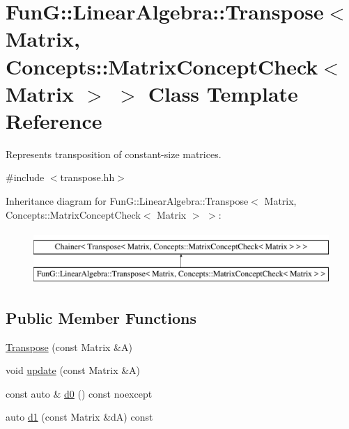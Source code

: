 \hypertarget{classFunG_1_1LinearAlgebra_1_1Transpose_3_01Matrix_00_01Concepts_1_1MatrixConceptCheck_3_01Matrix_01_4_01_4}{\section{Fun\-G\-:\-:Linear\-Algebra\-:\-:Transpose$<$ Matrix, Concepts\-:\-:Matrix\-Concept\-Check$<$ Matrix $>$ $>$ Class Template Reference}
\label{classFunG_1_1LinearAlgebra_1_1Transpose_3_01Matrix_00_01Concepts_1_1MatrixConceptCheck_3_01Matrix_01_4_01_4}
}


Represents transposition of constant-\/size matrices.  




{\ttfamily \#include $<$transpose.\-hh$>$}

Inheritance diagram for Fun\-G\-:\-:Linear\-Algebra\-:\-:Transpose$<$ Matrix, Concepts\-:\-:Matrix\-Concept\-Check$<$ Matrix $>$ $>$\-:\begin{figure}[H]
\begin{center}
\leavevmode
\includegraphics[height=2.000000cm]{classFunG_1_1LinearAlgebra_1_1Transpose_3_01Matrix_00_01Concepts_1_1MatrixConceptCheck_3_01Matrix_01_4_01_4}
\end{center}
\end{figure}
\subsection*{Public Member Functions}
\begin{DoxyCompactItemize}
\item 
\hyperlink{classFunG_1_1LinearAlgebra_1_1Transpose_3_01Matrix_00_01Concepts_1_1MatrixConceptCheck_3_01Matrix_01_4_01_4_adbcb05dc37fc93a30c3d131069b5cb98}{Transpose} (const Matrix \&A)
\item 
void \hyperlink{classFunG_1_1LinearAlgebra_1_1Transpose_3_01Matrix_00_01Concepts_1_1MatrixConceptCheck_3_01Matrix_01_4_01_4_abb53a9d48f7a4be92e6788a6d668bcfe}{update} (const Matrix \&A)
\item 
const auto \& \hyperlink{classFunG_1_1LinearAlgebra_1_1Transpose_3_01Matrix_00_01Concepts_1_1MatrixConceptCheck_3_01Matrix_01_4_01_4_afd43d1b0dbdb880c476fb66cbf239fb9}{d0} () const noexcept
\item 
auto \hyperlink{classFunG_1_1LinearAlgebra_1_1Transpose_3_01Matrix_00_01Concepts_1_1MatrixConceptCheck_3_01Matrix_01_4_01_4_a23a99c7b218fb61ae39c0e796dde050b}{d1} (const Matrix \&d\-A) const 
\end{DoxyCompactItemize}


